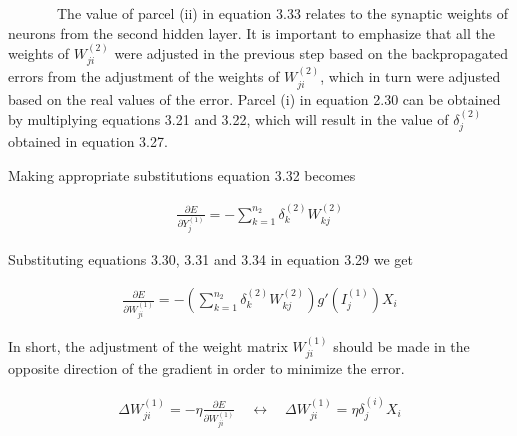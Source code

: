 \documentclass[
  12pt,
]{report}
\begin{document}
~~~~~~~The value of parcel (ii) in equation 3.33 relates to the synaptic
weights of neurons from the second hidden layer. It is important to
emphasize that all the weights of \(W_{ji}^{(2)}\) were adjusted in the
previous step based on the backpropagated errors from the adjustment of
the weights of \(W_{ji}^{(2)}\), which in turn were adjusted based on
the real values of the error. Parcel (i) in equation 2.30 can be
obtained by multiplying equations 3.21 and 3.22, which will result in
the value of \(δ_j^{(2)}\) obtained in equation 3.27.

Making appropriate substitutions equation 3.32 becomes

\vspace{-1em}

\begin{equation}
\begin{aligned}
\frac{\partial E}{\partial Y_j^{(1)}} = - \sum_{k=1}^{n_2} \delta_k^{(2)} W_{kj}^{(2)}
\label{eq:equation 3.34}
\end{aligned}
\end{equation} \vspace{-1em}

Substituting equations 3.30, 3.31 and 3.34 in equation 3.29 we get

\vspace{-1em}

\begin{equation}
\begin{aligned}
\frac{\partial E}{\partial W_{ji}^{(1)}} = - \left( \sum_{k=1}^{n_2} \delta_k^{(2)} W_{kj}^{(2)} \right) g'(I_j^{(1)}) X_i
\label{eq:equation 3.35}
\end{aligned}
\end{equation} \vspace{-1em}

In short, the adjustment of the weight matrix \(W_{ji}^{(1)}\) should be
made in the opposite direction of the gradient in order to minimize the
error.

\vspace{-1em}

\begin{equation}
\begin{aligned}
\Delta W_{ji}^{(1)} = - \eta \frac{\partial E}{\partial W_{ji}^{(1)}} \quad \leftrightarrow \quad \Delta W_{ji}^{(1)} = \eta \delta_j^{(i)} X_i
\label{eq:equation 3.36}
\end{aligned}
\end{equation} \vspace{-1em}
\end{document}
